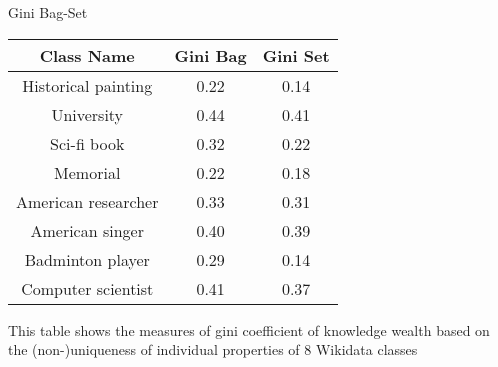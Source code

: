 \begin{center}
    \small
    \begin{threeparttable}
    \caption{Gini Bag-Set}
    \label{tab:gini bag-set}
    \begin{tabular}{c c c} 
    
    \toprule
        Class Name & Gini Bag & Gini Set \\ [0.5ex] 
    \midrule
        Historical painting & 0.22 & 0.14 \\
        University & 0.44 & 0.41 \\
        Sci-fi book & 0.32 & 0.22 \\
        Memorial & 0.22 & 0.18 \\
        American researcher & 0.33 & 0.31 \\
        American singer & 0.40 & 0.39 \\
        Badminton player & 0.29 & 0.14 \\
        Computer scientist & 0.41 & 0.37 \\
        [1ex]
    \bottomrule
    \end{tabular}
    \begin{tablenotes}
        \footnotesize
        This table shows the measures of gini coefficient of knowledge wealth based on the (non-)uniqueness of individual properties of 8 Wikidata classes
    \end{tablenotes}
    \end{threeparttable}
\end{center}